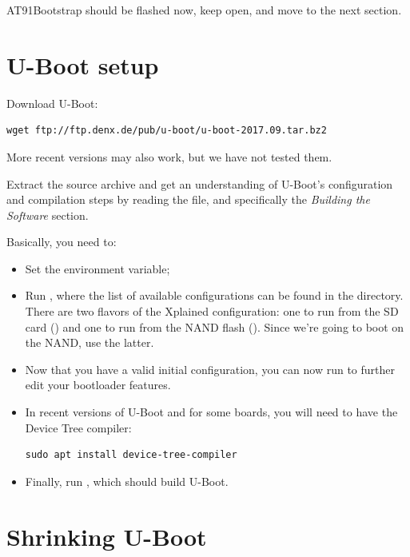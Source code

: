 AT91Bootstrap should be flashed now, keep  open, and move to
the next section.

\section{U-Boot setup}

Download U-Boot:

\begin{verbatim}
wget ftp://ftp.denx.de/pub/u-boot/u-boot-2017.09.tar.bz2
\end{verbatim}

More recent versions may also work, but we have not tested them.

Extract the source archive and get an understanding of U-Boot's
configuration and compilation steps by reading the  file,
and specifically the {\em Building the Software} section.

Basically, you need to:

\begin{itemize}

\item Set the  environment variable;

\item Run , where the list of available
  configurations can be found in the  directory. There
  are two flavors of the Xplained configuration: one to run from the
  SD card () and one to run from the NAND
  flash (). Since we're going to boot
  on the NAND, use the latter.

\item Now that you have a valid initial configuration, you can now
  run  to further edit your bootloader features. 

\item In recent versions of U-Boot and for some boards, you will
  need to have the Device Tree compiler:

\begin{verbatim}
sudo apt install device-tree-compiler
\end{verbatim}

\item Finally, run , which should build U-Boot.

\end{itemize}

\section{Shrinking U-Boot}

